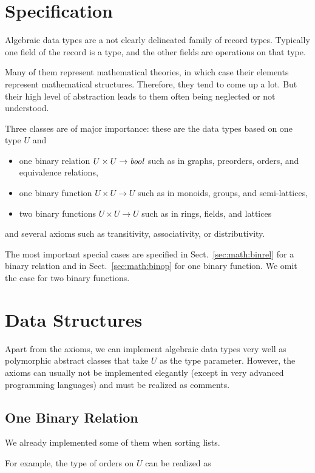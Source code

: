 \section{Specification}

Algebraic data types are a not clearly delineated family of record types.
Typically one field of the record is a type, and the other fields are operations on that type.

Many of them represent mathematical theories, in which case their elements represent mathematical structures.
Therefore, they tend to come up a lot.
But their high level of abstraction leads to them often being neglected or not understood.

Three classes are of major importance: these are the data types based on one type $U$ and
\begin{itemize}
\item one binary relation $U\times U \to \mathit{bool}$ such as in graphs, preorders, orders, and equivalence relations,
\item one binary function $U\times U\to U$ such as in monoids, groups, and semi-lattices,
\item two binary functions $U\times U\to U$ such as in rings, fields, and lattices
\end{itemize}
and several axioms such as transitivity, associativity, or distributivity.

The most important special cases are specified in Sect.~\ref{sec:math:binrel} for a binary relation and in Sect.~\ref{sec:math:binop} for one binary function.
We omit the case for two binary functions.

\section{Data Structures}

Apart from the axioms, we can implement algebraic data types very well as polymorphic abstract classes that take $U$ as the type parameter.
However, the axioms can usually not be implemented elegantly (except in very advanced programming languages) and must be realized as comments.

\subsection{One Binary Relation}

We already implemented some of them when sorting lists.

For example, the type of orders on $U$ can be realized as
\begin{acode}
\\
\\
\\
\end{acode}

